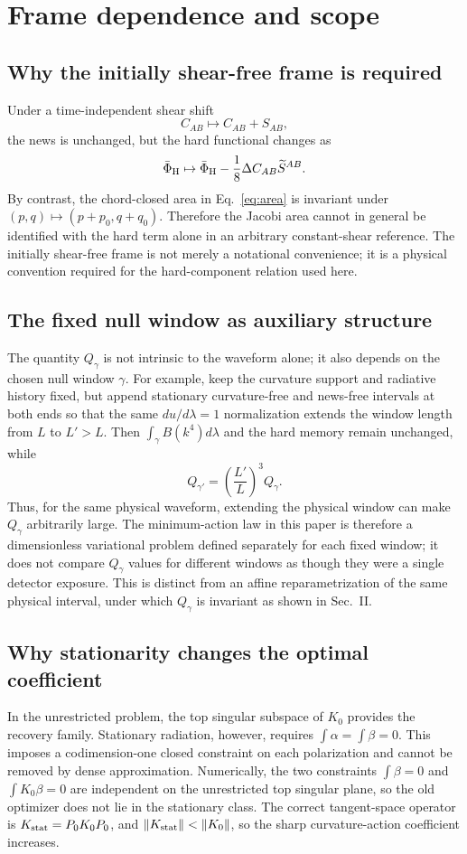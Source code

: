 \section{Frame dependence and scope}
\subsection{Why the initially shear-free frame is required}
Under a time-independent shear shift
\[
C_{AB}\mapsto C_{AB}+S_{AB},
\]
the news is unchanged, but the hard functional changes as
\[
\bar\Phi_{\rm H}\mapsto\bar\Phi_{\rm H}
-\frac18\Delta C_{AB}\widetilde S^{AB}.
\]
By contrast, the chord-closed area in Eq.~\eqref{eq:area} is invariant under $(p,q)\mapsto(p+p_0,q+q_0)$. Therefore the Jacobi area cannot in general be identified with the hard term alone in an arbitrary constant-shear reference. The initially shear-free frame is not merely a notational convenience; it is a physical convention required for the hard-component relation used here.

\subsection{The fixed null window as auxiliary structure}
The quantity $Q_\gamma$ is not intrinsic to the waveform alone; it also depends on the chosen null window $\gamma$. For example, keep the curvature support and radiative history fixed, but append stationary curvature-free and news-free intervals at both ends so that the same $du/d\lambda=1$ normalization extends the window length from $L$ to $L'>L$. Then $\int_\gamma B(k^4)d\lambda$ and the hard memory remain unchanged, while
\[
Q_{\gamma'}=\left(\frac{L'}{L}\right)^3Q_\gamma.
\]
Thus, for the same physical waveform, extending the physical window can make $Q_\gamma$ arbitrarily large. The minimum-action law in this paper is therefore a dimensionless variational problem defined separately for each fixed window; it does not compare $Q_\gamma$ values for different windows as though they were a single detector exposure. This is distinct from an affine reparametrization of the same physical interval, under which $Q_\gamma$ is invariant as shown in Sec.~II.

\subsection{Why stationarity changes the optimal coefficient}
In the unrestricted problem, the top singular subspace of $K_0$ provides the recovery family. Stationary radiation, however, requires $\int\alpha=\int\beta=0$. This imposes a codimension-one closed constraint on each polarization and cannot be removed by dense approximation. Numerically, the two constraints $\int\beta=0$ and $\int K_0\beta=0$ are independent on the unrestricted top singular plane, so the old optimizer does not lie in the stationary class. The correct tangent-space operator is $K_{\rm stat}=P_0K_0P_0$, and $\|K_{\rm stat}\|<\|K_0\|$, so the sharp curvature-action coefficient increases.

